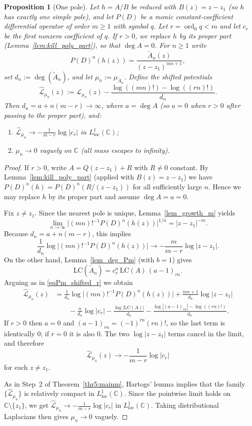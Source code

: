 \documentclass[12pt]{article}
\theoremstyle{plain}
\newtheorem{proposition}[theorem]{Proposition}
\theoremstyle{definition}
\begin{document}
\begin{proposition}[One pole]\label{prop:onepole}
Let $h=A/B$ be reduced with $B(z)=z-z_1$ (so $h$ has exactly one simple pole), and let $P(D)$ be a monic constant-coefficient differential operator of order $m\ge1$ with symbol $q$.
Let $r=\operatorname{ord}_0 q<m$ and let $c_r$ be the first nonzero coefficient of $q$.
If $r>0$, we replace $h$ by its proper part (Lemma~\ref{lem:kill_poly_part}), so that $\deg A=0$.
For $n\ge1$ write
$$P(D)^n(h(z))=\frac{\widetilde A_n(z)}{(z-z_1)^{mn+1}},$$
set $d_n:=\deg(\widetilde A_n)$, and let $\mu_n:=\mu_{\widetilde A_n}$.
Define the shifted potentials
$$\widehat{\mathcal L}_{\mu_n}(z):=\mathcal L_{\mu_n}(z)-\frac{\log((mn)!)-\log((rn)!)}{d_n}.$$
Then $d_n=a+n(m-r)\to\infty$, where $a=\deg A$ (so $a=0$ when $r>0$ after passing to the proper part), and:
\begin{enumerate}
\item[(i)] $\widehat{\mathcal L}_{\mu_n}\to -\frac{1}{m-r}\log|c_r|$ in $L^1_{\mathrm{loc}}(\mathbb C)$;
\item[(ii)] $\mu_n\to0$ vaguely on $\mathbb C$ (all mass escapes to infinity).
\end{enumerate}
\end{proposition}

\begin{proof}
If $r>0$, write $A=Q(z-z_1)+R$ with $R\neq0$ constant.
By Lemma~\ref{lem:kill_poly_part} (applied with $B(z)=z-z_1$) we have $P(D)^n(h)=P(D)^n(R/(z-z_1))$ for all sufficiently large $n$.
Hence we may replace $h$ by its proper part and assume $\deg A=a=0$.

Fix $z\neq z_1$.
Since the nearest pole is unique, Lemma~\ref{lem_growth_m} yields
$$\lim_{n\to\infty}\bigl|(mn)!^{-1}P(D)^n(h(z))\bigr|^{1/n}=|z-z_1|^{-m}.$$
Because $d_n=a+n(m-r)$, this implies
$$\frac{1}{d_n}\log\bigl|(mn)!^{-1}P(D)^n(h(z))\bigr|\longrightarrow -\frac{m}{m-r}\log|z-z_1|.$$
On the other hand, Lemma~\ref{lem_deg_Pm} (with $b=1$) gives
$$\mathrm{LC}(\widetilde A_n)=c_r^n\,\mathrm{LC}(A)\,(a-1)_{rn}.$$
Arguing as in \eqref{eqPm_shifted_r} we obtain
\begin{align*}
\widehat{\mathcal L}_{\mu_n}(z)
&= \frac{1}{d_n}\log\bigl|(mn)!^{-1}P(D)^n(h(z))\bigr|+\frac{mn+1}{d_n}\log|z-z_1|\\
&\qquad -\frac{n}{d_n}\log|c_r|-\frac{\log|\mathrm{LC}(A)|}{d_n}-\frac{\log|(a-1)_{rn}|-\log((rn)!)}{d_n}.
\end{align*}
If $r>0$ then $a=0$ and $(a-1)_{rn}=(-1)^{rn}(rn)!$, so the last term is identically $0$; if $r=0$ it is also $0$.
The two $\log|z-z_1|$ terms cancel in the limit, and therefore
$$\widehat{\mathcal L}_{\mu_n}(z)\longrightarrow -\frac{1}{m-r}\log|c_r|$$
for each $z\neq z_1$.

As in Step~2 of Theorem~\ref{thr5:mainm}, Hartogs' lemma implies that the family $\{\widehat{\mathcal L}_{\mu_n}\}$ is relatively compact in $L^1_{\mathrm{loc}}(\mathbb C)$.
Since the pointwise limit holds on $\mathbb C\setminus\{z_1\}$, we get $\widehat{\mathcal L}_{\mu_n}\to -\frac{1}{m-r}\log|c_r|$ in $L^1_{\mathrm{loc}}(\mathbb C)$.
Taking distributional Laplacians then gives $\mu_n\to0$ vaguely.
\end{proof}
\end{document}
